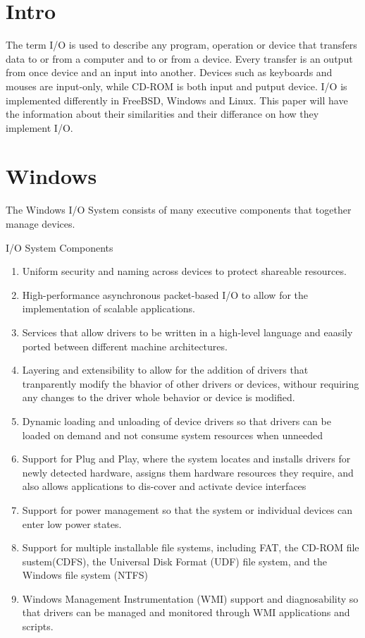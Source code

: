 \documentclass[letterpaper,10pt,draftclsnofoot,onecolumn]{IEEEtran}
\begin{document}
\section*{Intro}

The term I/O is used to describe any program, operation or device that transfers data to or from a computer and to or from a device. Every transfer is an output from once device and an input into another. Devices such as keyboards and mouses are input-only, while CD-ROM is both input and putput device. I/O is implemented differently in FreeBSD, Windows and Linux. This paper will have the information about their similarities and their differance on how they implement I/O.

\section*{Windows}

The Windows I/O System consists of many executive components that together manage devices. 

I/O System Components
\begin{enumerate}
\item Uniform security and naming across devices to protect shareable resources.
\item High-performance asynchronous packet-based I/O to allow for the implementation of scalable applications.
\item Services that allow drivers to be written in a high-level language and eaasily ported between different machine architectures.
\item Layering and extensibility to allow for the addition of drivers that tranparently modify the bhavior of other drivers or devices, withour requiring any changes to the driver whole behavior or device is modified.
\item Dynamic loading and unloading of device drivers so that drivers can be loaded on demand and not consume system resources when unneeded
\item Support for Plug and Play, where the system locates and installs drivers for newly detected hardware, assigns them hardware resources they require, and also allows applications to dis-cover and activate device interfaces
\item Support for power management so that the system or individual devices can enter low power states.
\item Support for multiple installable file systems, including FAT, the CD-ROM file sustem(CDFS), the Universal Disk Format (UDF) file system, and the Windows file system (NTFS)
\item Windows Management Instrumentation (WMI) support and diagnosability so that drivers can be managed and monitored through WMI applications and scripts.\cite{[1]}
\end{enumerate}
\end{document}
